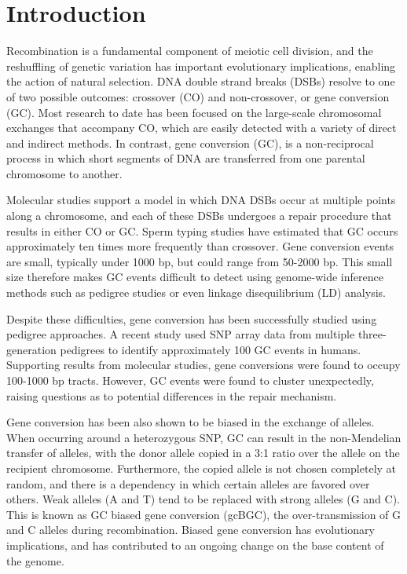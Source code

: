 
\section{Introduction}

Recombination is a fundamental component of meiotic cell division, and the reshuffling of genetic variation has important evolutionary implications, enabling the action of natural selection.
DNA double strand breaks (DSBs) resolve to one of two possible outcomes: crossover (CO) and non-crossover, or gene conversion (GC).
Most research to date has been focused on the large-scale chromosomal exchanges that accompany CO, which are easily detected with a variety of direct and indirect methods.
In contrast, gene conversion (GC), is a non-reciprocal process in which short segments of DNA are transferred from one parental chromosome to another.

Molecular studies support a model in which DNA DSBs occur at multiple points along a chromosome, and each of these DSBs undergoes a repair procedure that results in either CO or GC\cite{Baudat2007}.
Sperm typing studies have estimated that GC occurs approximately ten times more frequently than crossover\cite{Jeffreys2004,Baudat2007,Cole2012}.
Gene conversion events are small, typically under 1000 bp, but could range from 50-2000 bp\cite{Jeffreys2004}.
This small size therefore makes GC events difficult to detect using genome-wide inference methods such as pedigree studies or even linkage disequilibrium (LD) analysis.

Despite these difficulties, gene conversion has been successfully studied using pedigree approaches.
A recent study used SNP array data from multiple three-generation pedigrees to identify approximately 100 GC events in humans\cite{Williams2015}. 
Supporting results from molecular studies, gene conversions were found to occupy 100-1000 bp tracts.
However, GC events were found to cluster unexpectedly, raising questions as to potential differences in the repair mechanism.

Gene conversion has been also shown to be biased in the exchange of alleles\cite{Chen2007}.
When occurring around a heterozygous SNP, GC can result in the non-Mendelian transfer of alleles, with the donor allele copied in a 3:1 ratio over the allele on the recipient chromosome.
Furthermore, the copied allele is not chosen completely at random, and there is a dependency in which certain alleles are favored over others.
Weak alleles (A and T) tend to be replaced with strong alleles (G and C). %
This is known as GC biased gene conversion (gcBGC), the over-transmission of G and C alleles during recombination.
Biased gene conversion has evolutionary implications, and has contributed to an ongoing change on the base content of the genome\cite{Bherer2014}.

